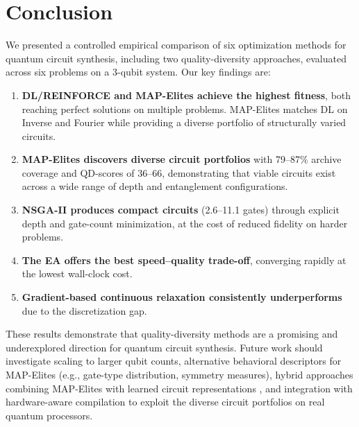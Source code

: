 \documentclass[twocolumn,11pt]{article}
\begin{document}
\section{Conclusion}\label{sec:conclusion}

We presented a controlled empirical comparison of six optimization methods for
quantum circuit synthesis, including two quality-diversity approaches, evaluated
across six problems on a 3-qubit system.  Our key findings are:

\begin{enumerate}[nosep]
    \item \textbf{DL/REINFORCE and MAP-Elites achieve the highest fitness},
          both reaching perfect solutions on multiple problems.  MAP-Elites
          matches DL on Inverse and Fourier while providing a diverse portfolio
          of structurally varied circuits.
    \item \textbf{MAP-Elites discovers diverse circuit portfolios} with
          79--87\% archive coverage and QD-scores of 36--66, demonstrating that
          viable circuits exist across a wide range of depth and entanglement
          configurations.
    \item \textbf{NSGA-II produces compact circuits} (2.6--11.1 gates) through
          explicit depth and gate-count minimization, at the cost of reduced
          fidelity on harder problems.
    \item \textbf{The EA offers the best speed--quality trade-off}, converging
          rapidly at the lowest wall-clock cost.
    \item \textbf{Gradient-based continuous relaxation consistently
          underperforms} due to the discretization gap.
\end{enumerate}

These results demonstrate that quality-diversity methods are a promising and
underexplored direction for quantum circuit synthesis.  Future work should
investigate scaling to larger qubit counts, alternative behavioral descriptors
for MAP-Elites (e.g., gate-type distribution, symmetry measures), hybrid
approaches combining MAP-Elites with learned circuit representations
\cite{sun2026qas}, and integration with hardware-aware compilation to exploit
the diverse circuit portfolios on real quantum processors.
\end{document}
